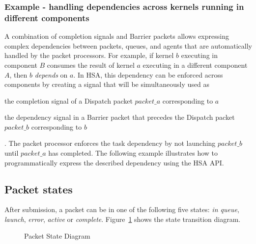 \documentclass[final]{book}
\begin{document}
\subsubsection{Example - handling dependencies across kernels running in
  different components}
A combination of completion signals and Barrier packets allows expressing
complex dependencies between packets, queues, and agents that are automatically
handled by the packet processors. For example, if kernel $b$ executing in
component $B$ consumes the result of kernel $a$ executing in a different
component $A$, then $b$ \textit{depends} on $a$. In HSA, this dependency can be
enforced across components by creating a signal that will be simultaneously used
as \begin{inparaenum}[I\upshape)] \item the completion signal of a Dispatch
  packet $packet\_a$ corresponding to $a$ \item the dependency signal in a
  Barrier packet that precedes the Dispatch packet $packet\_b$ corresponding to
  $b$\end{inparaenum}. The packet processor enforces the task dependency by not
launching $packet\_b$ until $packet\_a$ has completed. The following example
illustrates how to programmatically express the described dependency using the
HSA API.


\subsection{Packet states}\label{packet-states}

After submission, a packet can be in one of the following five states:
\emph{in queue}, \emph{launch}, \emph{error}, \emph{active} or
\emph{complete}. Figure~\ref{fig:packetstate} shows the state transition
diagram.

\begin{figure}[b]
  \centering
  \scriptsize
{}
  \centering
  \caption{Packet State Diagram}
  \label{fig:packetstate}
\end{figure}
\end{document}
